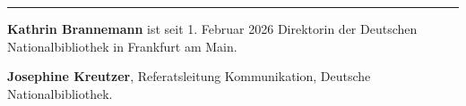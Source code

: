 \begin{center}\rule{0.5\linewidth}{0.5pt}\end{center}

\textbf{Kathrin Brannemann} ist
seit 1. Februar 2026 Direktorin der Deutschen Nationalbibliothek in
Frankfurt am Main.

\textbf{Josephine Kreutzer}, Referatsleitung Kommunikation, Deutsche
Nationalbibliothek.
